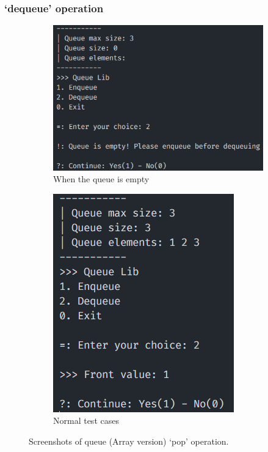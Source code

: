 \subsubsection*{`dequeue' operation}
\begin{figure}[!ht]
	\centering
	\begin{subfigure}{0.6\textwidth}
		\centering
		\includegraphics[width=\textwidth]{imgs/QueueArray/pop/empty.png}
		\caption{When the queue is empty}\label{fig:queue_arr_pop_empty}
	\end{subfigure}
	\hfill
	\begin{subfigure}{0.34\textwidth}
		\centering
		\includegraphics[width=\textwidth]{imgs/QueueArray/pop/normal.png}
		\caption{Normal test cases}\label{fig:queue_arr_pop_normal}
	\end{subfigure}
	\caption{Screenshots of queue (Array version) `pop' operation.}\label{fig:queue_arr_pop_cases}
\end{figure}

